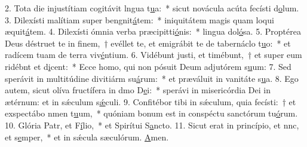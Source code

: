 2. Tota die injustítiam cogitávit lngua t\uline{u}a:~* sicut novácula acúta fecísti d\uline{o}lum.
3. Dilexísti malítiam super bengnit\uline{á}tem:~* iniquitátem magis quam loqui æquit\uline{á}tem.
4. Dilexísti ómnia verba præcipitti\uline{ó}nis:~* lingua dol\uline{ó}sa.
5. Proptérea Deus déstruet te in finem,~† evéllet te, et emigrábit te de tabernáclo t\uline{u}o:~* et radícem tuam de terra viv\uline{é}ntium.
6. Vidébunt justi, et timébunt,~† et super eum ridébnt et d\uline{i}cent:~* Ecce homo, qui non pósuit Deum adjutórem s\uline{u}um:
7. Sed sperávit in multitúdine divitiárm su\uline{á}rum:~* et præváluit in vanitáte s\uline{u}a.
8. Ego autem, sicut olíva fructífera in dmo D\uline{e}i:~* sperávi in misericórdia Dei in ætérnum: et in sǽculum s\uline{ǽ}culi.
9. Confitébor tibi in sǽculum, quia fecísti:~† et exspectábo nmen t\uline{u}um,~* quóniam bonum est in conspéctu sanctórum tu\uline{ó}rum.
10. Glória Patr, et F\uline{í}lio,~* et Spirítui S\uline{a}ncto.
11. Sicut erat in princípio, et nnc, et s\uline{e}mper,~* et in sǽcula sæculórum. \uline{A}men.
